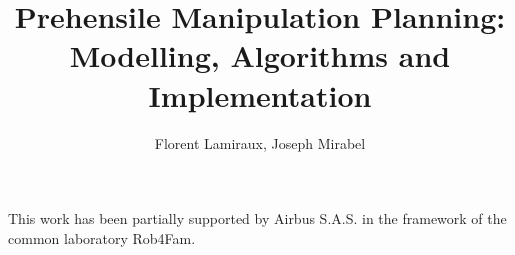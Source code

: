 \documentclass[Afour,sageh,times,doublespace]{sagej}
\begin{document}

\title{Prehensile Manipulation Planning: Modelling, Algorithms and Implementation}

\author{Florent Lamiraux, Joseph Mirabel}




\begin{abstract}
\end{abstract}


\maketitle



\begin{acks}
This work has been partially supported by Airbus S.A.S. in the framework of the common laboratory Rob4Fam.
\end{acks}

%



\end{document}
